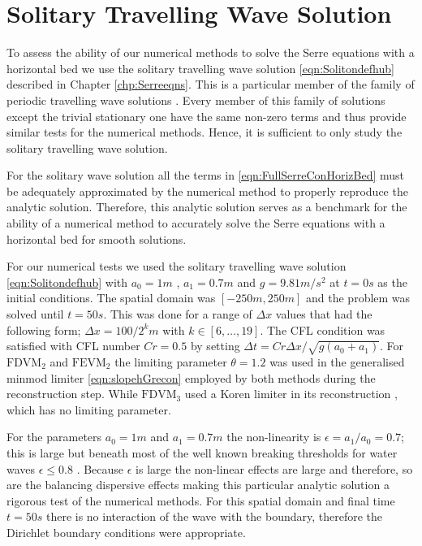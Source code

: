 \section{Solitary Travelling Wave Solution}
To assess the ability of our numerical methods to solve the Serre equations with a horizontal bed we use the solitary travelling wave solution \eqref{eqn:Solitondefhub} described in Chapter \ref{chp:Serreeqns}. This is a particular member of the family of periodic travelling wave solutions \cite{El-etal-2006}. Every member of this family of solutions except the trivial stationary one have the same non-zero terms and thus provide similar tests for the numerical methods. Hence, it is sufficient to only study the solitary travelling wave solution.

For the solitary wave solution all the terms in \eqref{eqn:FullSerreConHorizBed} must be adequately approximated by the numerical method to properly reproduce the analytic solution. Therefore, this analytic solution serves as a benchmark for the ability of a numerical method to accurately solve the Serre equations with a horizontal bed for smooth solutions.

For our numerical tests we used the solitary travelling wave solution \eqref{eqn:Solitondefhub} with $a_0 = 1m$ , $a_1 = 0.7m$ and $g= 9.81m/s^2$ at $t=0s$ as the initial conditions. The spatial domain was $[-250m,250m]$ and the problem was solved until $t= 50s$. This was done for a range of $\Delta x$ values that had the following form; $\Delta x = 100 / 2^k m$ with $k \in  \left[6,\dots,19\right]$. The CFL condition was satisfied with CFL number $Cr = 0.5$ by setting  $\Delta t = Cr \Delta x / \sqrt{g\left(a_0 + a_1\right)}$. For $\text{FDVM}_2$ and $\text{FEVM}_2$ the limiting parameter $\theta  = 1.2$ was used in the generalised minmod limiter \eqref{eqn:slopehGrecon} employed by both methods during the reconstruction step. While $\text{FDVM}_3$ used a Koren limiter in its reconstruction \cite{Zoppou-etal-2017}, which has no limiting parameter. 

For the parameters $a_0 = 1m$ and  $a_1 = 0.7m$ the non-linearity is $\epsilon = a_1 / a_0 = 0.7$; this is large but beneath most of the well known breaking thresholds for water waves $\epsilon \le 0.8$ \cite{Ippen-Kulin-1954-4}. Because $\epsilon$ is large the non-linear effects are large and therefore, so are the balancing dispersive effects making this particular analytic solution a rigorous test of the numerical methods. For this spatial domain and final time $t=50s$ there is no interaction of the wave with the boundary, therefore the Dirichlet boundary conditions were appropriate.


